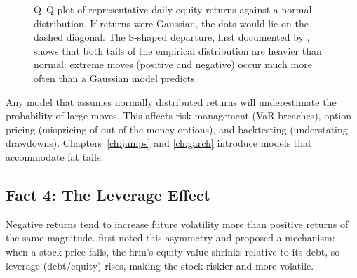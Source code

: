 \begin{figure}[htbp]
\caption{Q--Q plot of representative daily equity returns against a normal distribution.
If returns were Gaussian, the dots would lie on the dashed diagonal.
The S-shaped departure, first documented by \citet{Fama1965}, shows that both tails of the empirical distribution are heavier than normal: extreme moves (positive and negative) occur much more often than a Gaussian model predicts.}
\label{fig:fat-tails-qq}
\end{figure}

\begin{warning}
Any model that assumes normally distributed returns will underestimate the probability of large moves.
This affects risk management (VaR breaches), option pricing (mispricing of out-of-the-money options), and backtesting (understating drawdowns).
Chapters~\ref{ch:jumps} and \ref{ch:garch} introduce models that accommodate fat tails.
\end{warning}

\subsection{Fact 4: The Leverage Effect}
\label{sec:fact-leverage}

Negative returns tend to increase future volatility more than positive returns of the same magnitude.
\citet{Black1976} first noted this asymmetry and proposed a mechanism: when a stock price falls, the firm's equity value shrinks relative to its debt, so leverage (debt/equity) rises, making the stock riskier and more volatile.


